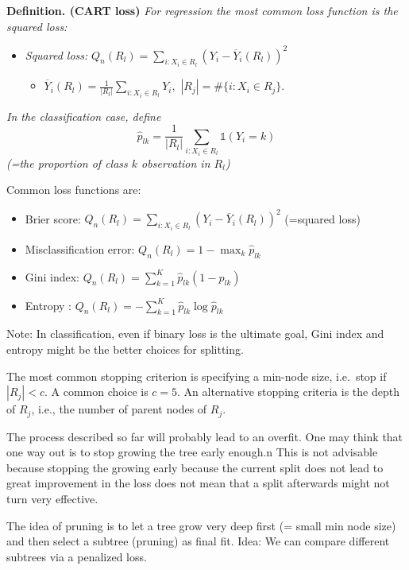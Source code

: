 \documentclass[
]{book}
\providecommand{\tightlist}{%
  \setlength{\itemsep}{0pt}\setlength{\parskip}{0pt}}
\begin{document}
\textbf{Definition. (CART loss)} \emph{For regression the most common loss function is the squared loss:}

\begin{itemize}
\tightlist
\item
  \emph{Squared loss:} \(Q_n(R_l)= \sum_{i: X_i \in R_l} (Y_i - \overline Y_i(R_l))^2\)

  \begin{itemize}
  \tightlist
  \item
    \(\overline Y_i(R_l)= \frac 1 {|R_l|}\sum_{i: X_i \in R_l}Y_i,\)
    \(|R_j|=\#\{i: X_i\in R_j\}\).
  \end{itemize}
\end{itemize}

\emph{In the classification case, define }
\[
\hat p_{lk}= \frac 1 {|R_l|} \sum_{i: X_i \in R_l}  \mathbb 1(Y_i=k)
\]
\emph{(=the proportion of class \(k\) observation in \(R_l\))}

Common loss functions are:

\begin{itemize}
\tightlist
\item
  Brier score: \(Q_n(R_l)= \sum_{i: X_i \in R_l} (Y_i - \overline Y_i(R_l))^2\) (=squared loss)
\item
  Misclassification error: \(Q_n(R_l)= 1 - \max_{k}\hat p_{lk}\)
\item
  Gini index: \(Q_n(R_l)= \sum_{k=1}^K \hat p_{lk}(1-\hat p_{lk})\)
\item
  Entropy : \(Q_n(R_l)=-\sum_{k=1}^K \hat p_{lk}\log\hat p_{lk}\)
\end{itemize}

Note: In classification, even if binary loss is the ultimate goal, Gini index and entropy might be the better choices for splitting.

The most common stopping criterion is specifying a min-node size, i.e.~stop if \(|R_j|<c\). A common choice is \(c=5\). An alternative stopping criteria is the depth of \(R_j\), i.e., the number of parent nodes of \(R_j\).

The process described so far will probably lead to an overfit. One may think that one way out is to stop growing the tree early enough.n This is not advisable because stopping the growing early because the current split does not lead to great improvement in the loss does not mean that a split afterwards might not turn very effective.

The idea of pruning is to let a tree grow very deep first (= small min node size) and then select a subtree (pruning) as final fit. Idea: We can compare different subtrees via a penalized loss.
\end{document}
